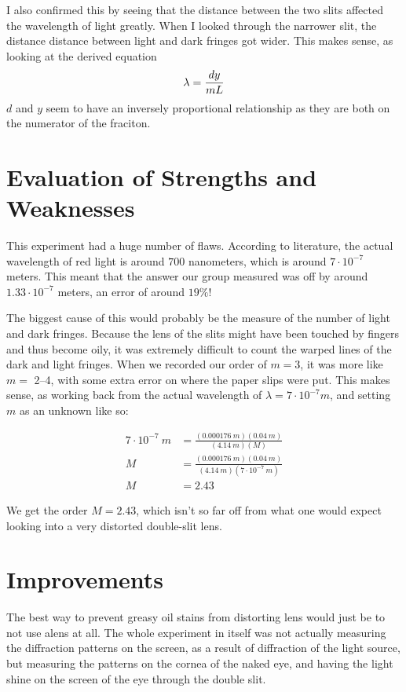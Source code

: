\documentclass[12pt]{article}
\begin{document}
I also confirmed this by seeing that the distance between the two slits affected the wavelength of light greatly. When I looked through the narrower slit, the distance distance between light and dark fringes got wider. This makes sense, as looking at the derived equation
$$
	\lambda      =\frac{dy}{mL}                                                                           \\
$$
\(d\) and \(y\) seem to have an inversely proportional relationship as they are both on the numerator of the fraciton.

\section{Evaluation of Strengths and Weaknesses}
This experiment had a huge number of flaws. According to literature, the actual wavelength of red light is around $700$ nanometers, which is around \(7\cdot10^{-7}\) meters. This meant that the answer our group measured was off by around $1.33\cdot 10^{-7}$ meters, an error of around \(19\%\)!

The biggest cause of this would probably be the measure of the number of light and dark fringes. Because the lens of the slits might have been touched by fingers and thus become oily, it was extremely difficult to count the warped lines of the dark and light fringes. When we recorded our order of $m=3$, it was more like $m=$ 2--4, with some extra error on where the paper slips were put. This makes sense, as working back from the actual wavelength of \(\lambda=7\cdot10^{-7} m\), and setting $m$ as an unknown like so:

\begin{align*}
7\cdot10^{-7}\ m & =\frac{\left(0.000176\ m\right)\left(0.04\ m\right)}{\left(4.14\ m\right)\left(M\right)}                \\
M                & =\frac{\left(0.000176\ m\right)\left(0.04\ m\right)}{\left(4.14\ m\right)\left(7\cdot10^{-7}\ m\right)} \\
M                & =\boxed{2.43}
\end{align*}

We get the order $M=2.43$, which isn't so far off from what one would expect looking into a very distorted double-slit lens.

\section{Improvements}
The best way to prevent greasy oil stains from distorting lens would just be to not use alens at all. The whole experiment in itself was not actually measuring the diffraction patterns on the screen, as a result of diffraction of the light source, but measuring the patterns on the cornea of the naked eye, and having the light shine on the screen of the eye through the double slit.
\end{document}
